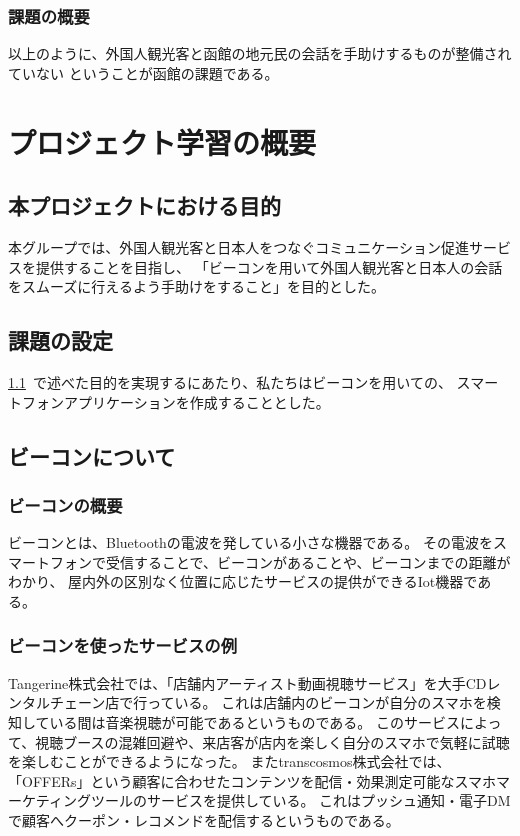 \documentclass[12pt,papersize]{jsbook}
\begin{document}
\subsection{課題の概要}
 以上のように、外国人観光客と函館の地元民の会話を手助けするものが整備されていない
ということが函館の課題である。



\chapter{プロジェクト学習の概要}

\section{本プロジェクトにおける目的}\label{sec:mokuteki}
 本グループでは、外国人観光客と日本人をつなぐコミュニケーション促進サービスを提供することを目指し、
「ビーコンを用いて外国人観光客と日本人の会話をスムーズに行えるよう手助けをすること」を目的とした。

\section{課題の設定}
\ref{sec:mokuteki}~で述べた目的を実現するにあたり、私たちはビーコンを用いての、
スマートフォンアプリケーションを作成することとした。

\section{ビーコンについて}
\subsection{ビーコンの概要}
 ビーコンとは、Bluetoothの電波を発している小さな機器である。
その電波をスマートフォンで受信することで、ビーコンがあることや、ビーコンまでの距離がわかり、
屋内外の区別なく位置に応じたサービスの提供ができるIot機器である。

\subsection{ビーコンを使ったサービスの例}
 Tangerine株式会社では、「店舗内アーティスト動画視聴サービス」を大手CDレンタルチェーン店で行っている。
これは店舗内のビーコンが自分のスマホを検知している間は音楽視聴が可能であるというものである。
このサービスによって、視聴ブースの混雑回避や、来店客が店内を楽しく自分のスマホで気軽に試聴を楽しむことができるようになった。
またtranscosmos株式会社では、「OFFERs」という顧客に合わせたコンテンツを配信・効果測定可能なスマホマーケティングツールのサービスを提供している。
これはプッシュ通知・電子DMで顧客へクーポン・レコメンドを配信するというものである。
\end{document}
